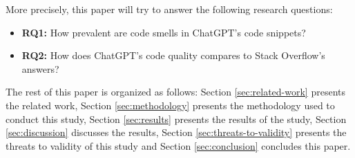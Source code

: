 More precisely, this paper will try to answer the following research questions: \\

\begin{itemize}
  \item \textbf{RQ1:} How prevalent are code smells in ChatGPT's code snippets?

  \item \textbf{RQ2:} How does ChatGPT's code quality compares to Stack Overflow's answers? \\

\end{itemize}

The rest of this paper is organized as follows: Section \ref{sec:related-work} presents the related work, Section \ref{sec:methodology} presents the methodology used to conduct this study, Section \ref{sec:results} presents the results of the study, Section \ref{sec:discussion} discusses the results, Section \ref{sec:threats-to-validity} presents the threats to validity of this study and Section \ref{sec:conclusion} concludes this paper.

